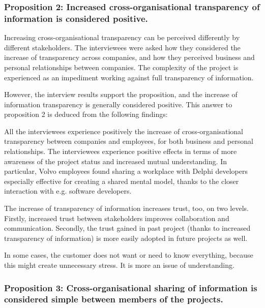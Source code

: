 \subsubsection{Proposition 2: Increased cross-organisational transparency of information is considered positive.}

Increasing cross-organisational transparency can be perceived differently by different stakeholders. The interviewees were asked how they considered the increase of transparency across companies, and how they perceived business and personal relationships between companies. The complexity of the project is experienced as an impediment working against full transparency of information.

However, the interview results support the proposition, and the increase of information transparency is generally considered positive. This answer to proposition 2 is deduced from the following findings:

 All the interviewees experience positively the increase of cross-organisational transparency between companies and employees, for both business and personal relationships. The interviewees experience positive effects in terms of more awareness of the project status and increased mutual understanding. In particular, Volvo employees found sharing a workplace with Delphi developers especially effective for creating a shared mental model, thanks to the closer interaction with e.g. software developers.

 The increase of transparency of information increases trust, too, on two levels. Firstly, increased trust between stakeholders improves collaboration and communication. Secondly, the trust gained in past project (thanks to increased transparency of information) is more easily adopted in future projects as well. 

 In some cases, the customer does not want or need to know everything, because this might create unnecessary stress. It is more an issue of understanding. 

\subsubsection{Proposition 3: Cross-organisational sharing of information is considered simple between members of the projects.}


